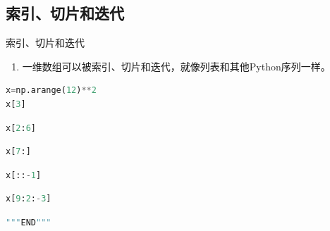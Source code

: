 \documentclass[ignorenonframetext,11pt,xcolor=dvipsnames,hyperref={colorlinks,allcolors=.,urlcolor=blue, citecolor=violet, bookmarksdepth=4},aspectratio=1610]{beamer}
\providecommand{\tightlist}{%
  \setlength{\itemsep}{0pt}\setlength{\parskip}{0pt}}
\begin{document}
\hypertarget{section-10}{%
\subsection{索引、切片和迭代}\label{section-10}}

\begin{frame}[fragile]{索引、切片和迭代}
\protect\hypertarget{section-11}{}

\begin{enumerate}
\tightlist
\item
  一维数组可以被索引、切片和迭代，就像列表和其他Python序列一样。
\end{enumerate}

\begin{lstlisting}[language=Python]
x=np.arange(12)**2
x[3]
\end{lstlisting}

\begin{lstlisting}[language=Python]
x[2:6]
\end{lstlisting}

\begin{lstlisting}[language=Python]
x[7:]
\end{lstlisting}

\begin{lstlisting}[language=Python]
x[::-1]
\end{lstlisting}

\begin{lstlisting}[language=Python]
x[9:2:-3]
\end{lstlisting}

\begin{lstlisting}[language=Python]
"""END"""
\end{lstlisting}

\end{frame}
\end{document}
